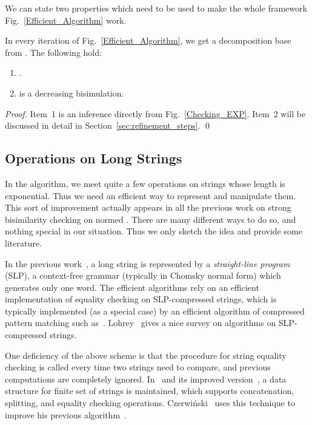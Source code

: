 \documentclass{llncs}
\begin{document}
We can state two properties which need to be used to make the whole framework Fig.~\ref{Efficient_Algorithm} work.
\begin{lemma}
In every iteration of Fig.~\ref{Efficient_Algorithm}, we get a decomposition base  from . The following hold:
\begin{enumerate}
\item
.

\item
 is a decreasing bisimulation.
\end{enumerate}
\end{lemma}

\begin{proof}
 Item~1  is an inference directly from Fig.~\ref{Checking_EXP}. Item~2  will be discussed in detail in Section~\ref{sec:refinement_steps}.  \qed
\end{proof}

\subsection{Operations on Long Strings}\label{subsec:longstring}
In the algorithm, we meet quite a few operations on strings whose length is exponential. Thus we need an efficient way to represent and manipulate them.
This sort of improvement actually appears in all the previous work on strong bisimilarity checking on normed . There are many different ways to do so, and nothing special in our situation.  Thus we only sketch the idea and provide some literature.

In the previous work~\cite{DBLP:journals/tcs/HirshfeldJM96,DBLP:conf/mfcs/LasotaR06,DBLP:conf/fsttcs/CzerwinskiL10}, a long string is represented by a {\em straight-line program} (SLP), a
context-free grammar (typically in Chomsky normal form) which generates only one word.
The efficient algorithms rely on an efficient implementation of equality checking on SLP-compressed strings, which is typically implemented (as a special case) by an efficient algorithm of compressed pattern matching such as~\cite{DBLP:conf/cpm/MiyazakiST97,DBLP:conf/dagstuhl/Lifshits06}.  Lohrey~\cite{DBLP:journals/gcc/Lohrey12} gives a nice survey on algorithms on SLP-compressed strings.

One deficiency of the above scheme is that  the procedure for string equality checking is called every time two strings need to compare, and previous computations are completely ignored. In~\cite{DBLP:journals/algorithmica/MehlhornSU97} and its improved version~\cite{DBLP:conf/soda/AlstrupBR00}, a data structure for finite set of strings is maintained, which supports concatenation, splitting, and equality checking operations.  Czerwi\'{n}ski~\cite{CzerwinskiPhD} uses this technique to improve his previous algorithm~\cite{DBLP:conf/fsttcs/CzerwinskiL10}.
\end{document}
